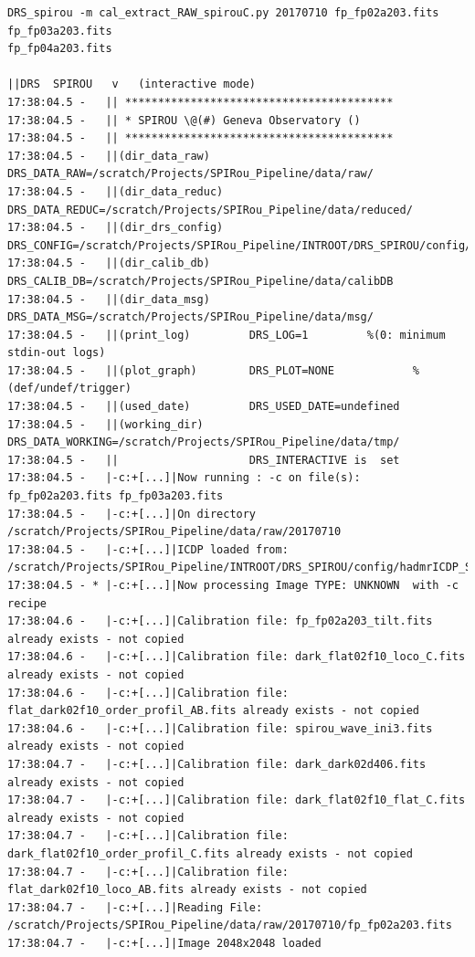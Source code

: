 \begin{lstlisting}[style=text]
DRS_spirou -m cal_extract_RAW_spirouC.py 20170710 fp_fp02a203.fits fp_fp03a203.fits
fp_fp04a203.fits

||DRS  SPIROU   v   (interactive mode)
17:38:04.5 -   || *****************************************
17:38:04.5 -   || * SPIROU \@(#) Geneva Observatory ()
17:38:04.5 -   || *****************************************
17:38:04.5 -   ||(dir_data_raw)      DRS_DATA_RAW=/scratch/Projects/SPIRou_Pipeline/data/raw/
17:38:04.5 -   ||(dir_data_reduc)    DRS_DATA_REDUC=/scratch/Projects/SPIRou_Pipeline/data/reduced/
17:38:04.5 -   ||(dir_drs_config)    DRS_CONFIG=/scratch/Projects/SPIRou_Pipeline/INTROOT/DRS_SPIROU/config/
17:38:04.5 -   ||(dir_calib_db)      DRS_CALIB_DB=/scratch/Projects/SPIRou_Pipeline/data/calibDB
17:38:04.5 -   ||(dir_data_msg)      DRS_DATA_MSG=/scratch/Projects/SPIRou_Pipeline/data/msg/
17:38:04.5 -   ||(print_log)         DRS_LOG=1         %(0: minimum stdin-out logs)
17:38:04.5 -   ||(plot_graph)        DRS_PLOT=NONE            %(def/undef/trigger)
17:38:04.5 -   ||(used_date)         DRS_USED_DATE=undefined
17:38:04.5 -   ||(working_dir)       DRS_DATA_WORKING=/scratch/Projects/SPIRou_Pipeline/data/tmp/
17:38:04.5 -   ||                    DRS_INTERACTIVE is  set
17:38:04.5 -   |-c:+[...]|Now running : -c on file(s):  fp_fp02a203.fits fp_fp03a203.fits
17:38:04.5 -   |-c:+[...]|On directory /scratch/Projects/SPIRou_Pipeline/data/raw/20170710
17:38:04.5 -   |-c:+[...]|ICDP loaded from: /scratch/Projects/SPIRou_Pipeline/INTROOT/DRS_SPIROU/config/hadmrICDP_SPIROU.py
17:38:04.5 - * |-c:+[...]|Now processing Image TYPE: UNKNOWN  with -c recipe
17:38:04.6 -   |-c:+[...]|Calibration file: fp_fp02a203_tilt.fits already exists - not copied
17:38:04.6 -   |-c:+[...]|Calibration file: dark_flat02f10_loco_C.fits already exists - not copied
17:38:04.6 -   |-c:+[...]|Calibration file: flat_dark02f10_order_profil_AB.fits already exists - not copied
17:38:04.6 -   |-c:+[...]|Calibration file: spirou_wave_ini3.fits already exists - not copied
17:38:04.7 -   |-c:+[...]|Calibration file: dark_dark02d406.fits already exists - not copied
17:38:04.7 -   |-c:+[...]|Calibration file: dark_flat02f10_flat_C.fits already exists - not copied
17:38:04.7 -   |-c:+[...]|Calibration file: dark_flat02f10_order_profil_C.fits already exists - not copied
17:38:04.7 -   |-c:+[...]|Calibration file: flat_dark02f10_loco_AB.fits already exists - not copied
17:38:04.7 -   |-c:+[...]|Reading File: /scratch/Projects/SPIRou_Pipeline/data/raw/20170710/fp_fp02a203.fits
17:38:04.7 -   |-c:+[...]|Image 2048x2048 loaded

\end{lstlisting}
